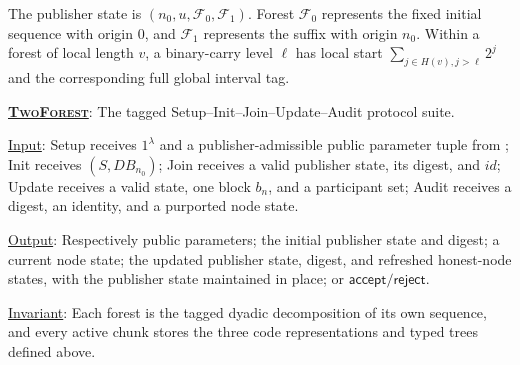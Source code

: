 \documentclass[11pt]{article}
\newenvironment{fminipage}%
  {\begin{Sbox}\begin{minipage}}%
  {\end{minipage}\end{Sbox}\fbox{\TheSbox}}
\newenvironment{algbox}[0]{%
\vskip 0.2in
\noindent
\begin{fminipage}{6.3in}
}{%
\end{fminipage}
\vskip 0.2in
}
\begin{document}
The publisher state is $(n_0,u,\mathcal F_0,\mathcal F_1)$.  Forest
$\mathcal F_0$ represents the fixed initial sequence with origin $0$, and
$\mathcal F_1$ represents the suffix with origin $n_0$.  Within a forest of
local length $v$, a binary-carry level $\ell$ has local start
$\sum_{j\in H(v),j>\ell}2^j$ and the corresponding full global interval tag.

\begin{algbox}
\textbf{\uline{\textsc{TwoForest}}}: The tagged
Setup--Init--Join--Update--Audit protocol suite.
\label{alg:twoforest}

\uline{Input}: Setup receives $1^\lambda$ and a publisher-admissible public
parameter tuple from ;
Init receives $(S,\mathit{DB}_{n_0})$; Join receives a valid publisher state,
its digest, and $\mathit{id}$; Update receives a valid state, one block $b_n$,
and a participant set; Audit receives a digest, an identity, and a purported
node state.

\uline{Output}: Respectively public parameters; the initial publisher state
and digest; a current node state; the updated publisher state, digest, and
refreshed honest-node states, with the publisher state maintained in place; or
$\mathsf{accept}/\mathsf{reject}$.

\uline{Invariant}: Each forest is the tagged dyadic decomposition of its own
sequence, and every active chunk stores the three code representations and
typed trees defined above.


\end{algbox}
\end{document}
